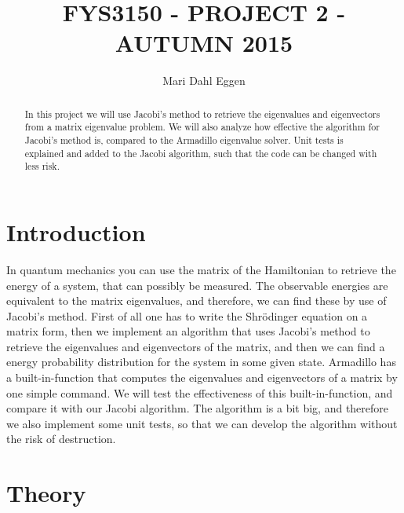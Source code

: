 \documentclass[12pt]{article}
\begin{document}
\title{FYS3150 - PROJECT 2 - AUTUMN 2015}
\author{Mari Dahl Eggen}
\maketitle

\newpage

\begin{flushleft}
\begin{abstract}
In this project we will use Jacobi's method to retrieve the eigenvalues and eigenvectors from a matrix eigenvalue problem. We will also analyze how effective the algorithm for Jacobi's method is, compared  to the Armadillo eigenvalue solver. Unit tests is explained and added to the Jacobi algorithm, such that the code can be changed with less risk.
\end{abstract}
\section{Introduction}
In quantum mechanics you can use the matrix of the Hamiltonian to retrieve the energy of a system, that can possibly be measured. The observable energies are equivalent to the matrix eigenvalues, and therefore, we can find these by use of Jacobi's method. First of all one has to write the Shr\"odinger equation on a matrix form, then we implement an algorithm that uses Jacobi's method to retrieve the eigenvalues and eigenvectors of the matrix, and then we can find a energy probability distribution for the system in some given state. Armadillo has a built-in-function that computes the eigenvalues and eigenvectors of a matrix by one simple command. We will test the effectiveness of this built-in-function, and compare it with our Jacobi algorithm. The algorithm is a bit big, and therefore we also implement some unit tests, so that we can develop the algorithm without the risk of destruction. 


\newpage
\section{Theory}

\end{flushleft}
\end{document}
